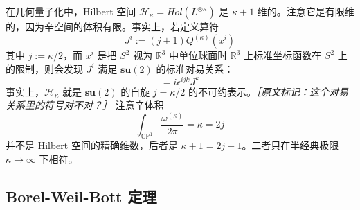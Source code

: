 在几何量子化中，Hilbert 空间 $\mathcal{H}_\kappa=Hol(L^{\otimes\kappa})$ 是 $\kappa+1$ 维的。注意它是有限维的，因为辛空间的体积有限。事实上，若定义算符
\begin{equation}
  J^i:=(j+1)Q^{(\kappa)}(x^i)
  \tag{B.32}
  \label{eq:B.32}
\end{equation}
其中 $j:=\kappa/2$，而 $x^i$ 是把 $S^2$ 视为 $\mathbb{R}^3$ 中单位球面时 $\mathbb{R}^3$ 上标准坐标函数在 $S^2$ 上的限制，则会发现 $J^i$ 满足 $\mathbf{su}(2)$ 的标准对易关系：
\begin{equation}
  [J^i,J^j]=i\epsilon^{ijk}J^k
  \tag{B.33}
  \label{eq:B.33}
\end{equation}
事实上，$\mathcal{H}_\kappa$ 就是 $\mathbf{su}(2)$ 的自旋 $j=\kappa/2$ 的不可约表示。{\small\itshape ［原文标记：这个对易关系里的符号对不对？］}
注意辛体积
\begin{equation}
  \int_{\mathbb{CP}^1}\frac{\omega^{(\kappa)}}{2\pi}=\kappa=2j
  \tag{B.34}
  \label{eq:B.34}
\end{equation}
并不是 Hilbert 空间的精确维数，后者是 $\kappa+1=2j+1$。二者只在半经典极限 $\kappa\to\infty$ 下相符。

\subsection{Borel-Weil-Bott 定理} %


